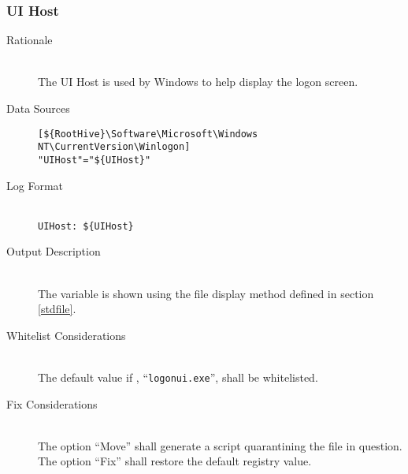 \subsubsection{UI Host}
\begin{description}
\item[Rationale] \hfill \\
The UI Host is used by Windows to help display the logon screen.
\item[Data Sources] \hfill
\vspace{-\baselineskip}
\begin{verbatim}
[${RootHive}\Software\Microsoft\Windows NT\CurrentVersion\Winlogon]
"UIHost"="${UIHost}"
\end{verbatim}
\item[Log Format] \hfill \\
\verb|UIHost: ${UIHost}|
\item[Output Description] \hfill \\
The variable  is shown using the file display method defined in
section \ref{stdfile}.
\item[Whitelist Considerations] \hfill \\
The default value if , ``\verb|logonui.exe|'', shall be whitelisted.
\item[Fix Considerations] \hfill \\
The option ``Move'' shall generate a script quarantining the file in question.
The option ``Fix'' shall restore the default registry value.
\end{description}

